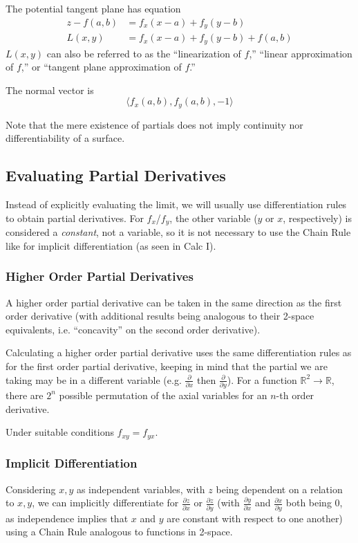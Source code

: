 \documentclass{article}
\begin{document}
The potential tangent plane has equation
\begin{align*}
	z - f(a,b) &= f_x(x - a) + f_y(y - b)\\
	L(x,y) &= f_x(x-a) + f_y(y-b) + f(a,b)
\end{align*}
$L(x,y)$ can also be referred to as the ``linearization of $f$,'' ``linear approximation of $f$,'' or ``tangent plane approximation of $f$.''

The normal vector is
$$\langle f_x(a,b), f_y(a,b), -1 \rangle$$

Note that the mere existence of partials does not imply continuity nor differentiability of a surface.

\subsection{Evaluating Partial Derivatives}
Instead of explicitly evaluating the limit, we will usually use differentiation rules to obtain partial derivatives. For $f_x$/$f_y$, the other variable ($y$ or $x$, respectively) is considered a \emph{constant}, not a variable, so it is not necessary to use the Chain Rule like for implicit differentiation (as seen in Calc I).

\subsubsection{Higher Order Partial Derivatives}
A higher order partial derivative can be taken in the same direction as the first order derivative (with additional results being analogous to their 2-space equivalents, i.e. ``concavity'' on the second order derivative).

Calculating a higher order partial derivative uses the same differentiation rules as for the first order partial derivative, keeping in mind that the partial we are taking may be in a different variable (e.g. $\frac{\partial}{\partial x}$ then $\frac{\partial}{\partial y}$). For a function $\mathbb{R}^2\to\mathbb{R}$, there are $2^n$ possible permutation of the axial variables for an $n$-th order derivative.

Under suitable conditions $f_{xy} = f_{yx}$.

\subsubsection{Implicit Differentiation}
Considering $x,y$ as independent variables, with $z$ being dependent on a relation to $x,y$, we can implicitly differentiate for $\frac{\partial z}{\partial x}$ or $\frac{\partial z}{\partial y}$ (with $\frac{\partial y}{\partial x}$ and $\frac{\partial x}{\partial y}$ both being $0$, as independence implies that $x$ and $y$ are constant with respect to one another) using a Chain Rule analogous to functions in 2-space.
\end{document}
